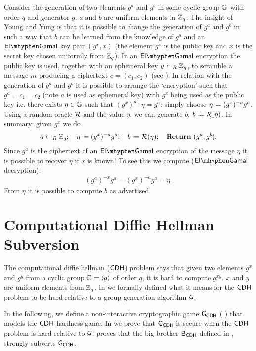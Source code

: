 Consider the generation of two elements $g^a$ and $g^b$ in some cyclic group $\mathbb{G}$ with order $q$ and generator $g$. $a$ and $b$ are uniform elements in $\mathbb{Z}_q$. The insight of Young and Yung is that it is possible to change the generation of $g^a$ and $g^b$ in such a way that $b$ can be learned from the knowledge of $g^a$ and an $\elGamal$ key pair $(g^x,x)$ (the element $g^x$ is the public key and $x$ is the secret key chosen uniformly from $\mathbb{Z}_q$). In an $\elGamal$ encryption the public key is used, together with an ephemeral key $y\leftarrow_R\mathbb{Z}_q$, to scramble a message $m$ producing a ciphertext $c=(c_1,c_2)$ (see ). In relation with the generation of $g^a$ and $g^b$ it is possible to arrange the `encryption' such that $g^a = c_1 = c_2$ (note $a$ is used as ephemeral key) with $g^x$ being used as the public key i.e. there exists $\eta\in\mathbb{G}$ such that $(g^x)^a\cdot \eta = g^a$: simply choose $\eta\defeq (g^x)^{-a}g^a$. Using a random oracle $\operatorname{\mathcal{R}}$ and the value $\eta$, we can generate $b$: $b\defeq \RO(\eta)$. In summary: given $g^x$ we do
\begin{align*}
	a\unileft\Zq;\quad \eta\defeq (g^x)^{-a}g^a;\quad b\defeq\RO(\eta);\quad \mbox{\Ret } (g^a,g^b).
\end{align*}
Since $g^a$ is the ciphertext of an $\elGamal$ encryption of the message $\eta$ it is possible to recover $\eta$ if $x$ is known! To see this we compute ($\elGamal$ decryption):
\begin{align*}
	(g^a)^{-x}g^a = (g^x)^{-a}g^a = \eta.
\end{align*}
From $\eta$ it is possible to compute $b$ as advertised. 

\section{Computational Diffie Hellman Subversion}

The computational diffie hellman ($\mathsf{CDH}$) problem says that given two elements $g^x$ and $g^y$ from a cyclic group $\mathbb{G} = \langle g \rangle$ of order $q$, it is hard to compute $g^{xy}$. $x$ and $y$ are uniform elements from $\mathbb{Z}_q$. In  we formally defined what it means for the $\mathsf{CDH}$ problem to be hard relative to a group-generation algorithm $\operatorname{\mathcal{G}}$. 

In the following, we define a non-interactive cryptographic game $\operatorname{\mathsf{G}}_{\mathsf{CDH}}$ ( ) that models the $\mathsf{CDH}$ hardness game. In  we prove that $\operatorname{\mathsf{G}}_{\mathsf{CDH}}$ is secure when the $\mathsf{CDH}$ problem is hard relative to $\operatorname{\mathcal{G}}$.  proves that the big brother $\mathsf{B}_{\mathsf{CDH}}$ defined in , strongly subverts $\operatorname{\mathsf{G}}_{\mathsf{CDH}}$. 

